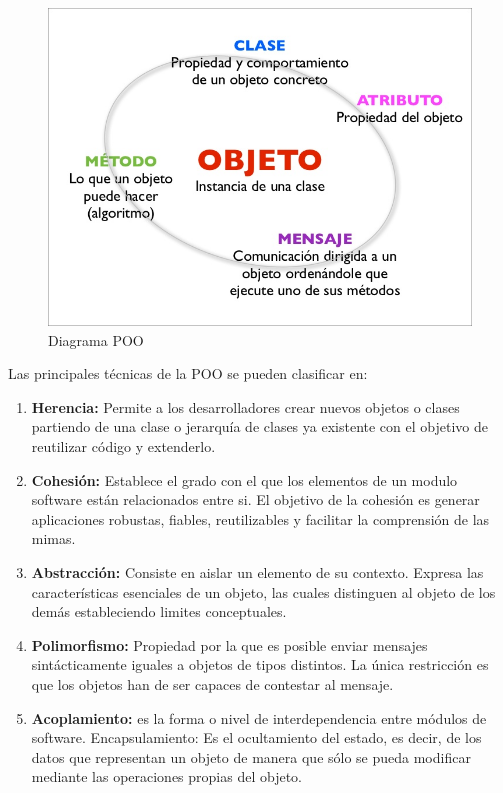 \documentclass[a4paper,11pt]{book}
\begin{document}
\begin{figure}[H] 
\centering 
\includegraphics[scale=0.35]{imagenes/desarrollo_herramienta/pdo.jpg}
\caption{ Diagrama POO\cite{poo}}
\end{figure}


Las principales técnicas de la POO se pueden clasificar en:


\begin{enumerate}
\item \textbf{Herencia:} Permite a los desarrolladores crear nuevos objetos o clases partiendo de una clase o jerarquía de clases ya existente con el objetivo de reutilizar código y extenderlo. 
\item \textbf{Cohesión:} Establece el grado con el que los elementos de un modulo software están relacionados entre si. El objetivo de la cohesión es generar aplicaciones robustas, fiables, reutilizables y facilitar la comprensión de las mimas.
\item \textbf{Abstracción:} Consiste en aislar un elemento de su contexto. Expresa las características esenciales de un objeto, las cuales distinguen al objeto de los demás estableciendo limites conceptuales.
\item \textbf{Polimorfismo:} Propiedad por la que es posible enviar mensajes sintácticamente iguales a objetos de tipos distintos. La única restricción es que los objetos han de ser capaces de contestar al mensaje. 
\item \textbf{Acoplamiento:} es la forma o nivel de interdependencia entre módulos de software. 
 Encapsulamiento: Es el ocultamiento del estado, es decir, de los datos que representan un objeto de manera que sólo se pueda modificar mediante las operaciones propias del objeto.
\end{enumerate}
\end{document}
